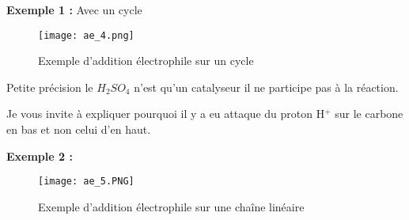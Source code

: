 \documentclass[a4paper, oneside]{book}
\begin{document}
\textbf{Exemple 1 :} Avec un cycle 
\begin{figure}[!h]
    \centering
    \texttt{[image: ae\_4.png]}
    \caption{Exemple d'addition électrophile sur un cycle}
    \label{fig:my_label}
\end{figure}

Petite précision le $H_2SO_4$ n'est qu'un catalyseur il ne participe pas à la réaction.

Je vous invite à expliquer pourquoi il y a eu attaque du proton H$^+$ sur le carbone en bas et non celui d'en haut.

\textbf{Exemple 2 :}
\begin{figure}[!h]
    \centering
    \texttt{[image: ae\_5.PNG]}
    \caption{Exemple d'addition électrophile sur une chaîne linéaire}
    \label{fig:my_label}
\end{figure}
\end{document}

